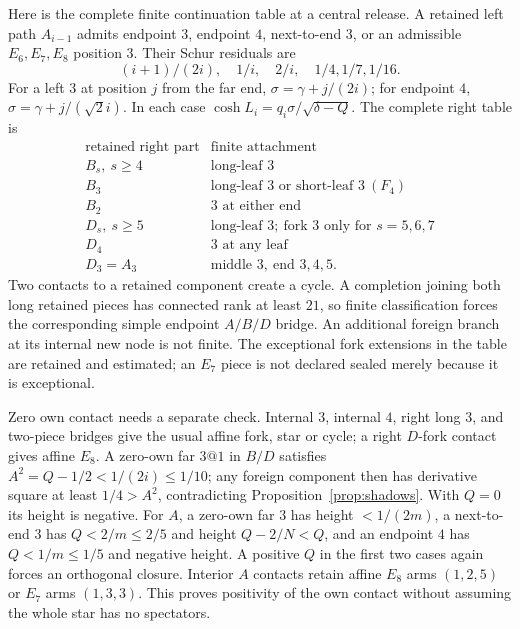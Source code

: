 Here is the complete finite continuation table at a central release.
A retained left path $A_{i-1}$ admits endpoint $3$, endpoint $4$,
next-to-end $3$, or an admissible $E_6,E_7,E_8$ position $3$.
Their Schur residuals are
\begin{equation}\label{app:tail:eq:leftresiduals}
 (i+1)/(2i),\quad1/i,\quad2/i,\quad1/4,1/7,1/16.
\end{equation}
For a left $3$ at position $j$ from the far end,
$\sigma=\gamma+j/(2i)$; for endpoint $4$,
$\sigma=\gamma+j/(\sqrt2 i)$. In each case
$\cosh L_i=q_i\sigma/\sqrt{\delta-Q}$.
The complete right table is
\[
\begin{array}{c|l}
\text{retained right part}&\text{finite attachment}\\ \hline
B_s,\ s\ge4&\text{long-leaf }3\\
B_3&\text{long-leaf }3\text{ or short-leaf }3\ (F_4)\\
B_2&3\text{ at either end}\\
D_s,\ s\ge5&\text{long-leaf }3;\ \text{fork }3\text{ only for }s=5,6,7\\
D_4&3\text{ at any leaf}\\
D_3=A_3&\text{middle }3,\ \text{end }3,4,5 .
\end{array}
\]
Two contacts to a retained component create a cycle. A completion
joining both long retained pieces has connected rank at least $21$,
so finite classification forces the corresponding simple endpoint
$A/B/D$ bridge. An additional foreign branch at its internal new
node is not finite. The exceptional fork extensions in the table
are retained and estimated; an $E_7$ piece is not declared sealed
merely because it is exceptional.

Zero own contact needs a separate check. Internal $3$, internal $4$,
right long $3$, and two-piece bridges give the usual affine fork,
star or cycle; a right $D$-fork contact gives affine $E_8$.
A zero-own far $3@1$ in $B/D$ satisfies
$A^2=Q-1/2<1/(2i)\le1/10$; any foreign component then has
derivative square at least $1/4>A^2$, contradicting
Proposition~\ref{prop:shadows}. With $Q=0$ its height is negative.
For $A$, a zero-own far $3$ has height $<1/(2m)$, a next-to-end
$3$ has $Q<2/m\le2/5$ and height $Q-2/N<Q$, and an endpoint
$4$ has $Q<1/m\le1/5$ and negative height. A positive $Q$ in
the first two cases again forces an orthogonal closure. Interior
$A$ contacts retain affine $E_8$ arms $(1,2,5)$ or $E_7$ arms
$(1,3,3)$. This proves positivity of the own contact without
assuming the whole star has no spectators.

